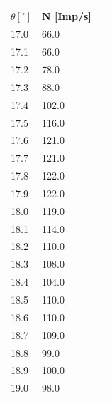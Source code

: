\begin{minipage}{\linewidth}
    \begin{table}[H]
        \centering
    \begin{tabular}{lll}
        \toprule
        $\theta [^\circ]$ & N [Imp/s] \\
        \midrule
        17.0  &	66.0  \\
        17.1  &	66.0  \\
        17.2  &	78.0  \\
        17.3  &	88.0  \\
        17.4  &	102.0 \\
        17.5  &	116.0 \\
        17.6  &	121.0 \\
        17.7  &	121.0 \\
        17.8  &	122.0 \\
        17.9  &	122.0 \\
        18.0  &	119.0 \\
        18.1  &	114.0 \\
        18.2  &	110.0 \\
        18.3  &	108.0 \\
        18.4  &	104.0 \\
        18.5  &	110.0 \\
        18.6  &	110.0 \\
        18.7  &	109.0 \\
        18.8  &	99.0  \\
        18.9  &	100.0 \\
        19.0  &	98.0  \\
        \bottomrule   
    \end{tabular}
    
    \label{tab:4}
\end{table}
\end{minipage}

